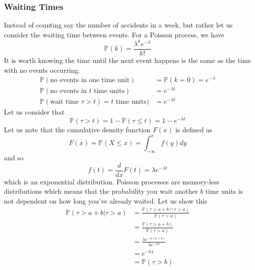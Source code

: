 \documentclass{article}
\newcommand{\od}[2]{\frac{d #1}{d #2}}
\newcommand{\p}{\mathbb{P}}
\theoremstyle{definition}
\begin{document}
\subsubsection{Waiting Times}
Instead of counting say the number of accidents in a week, but rather let us consider the waiting time between events. For a Poisson process, we have 
\begin{equation*}
    \p(k) = \frac{\lambda^ke^{-\lambda}}{k!}
\end{equation*}
It is worth knowing the time until the next event happens is the same as the time with no events occurring. 
\begin{equation*}
    \begin{split}
        \p(\text{no events in one time unit}) &=\p(k=0) = e^{-\lambda} \\
        \p(\text{no events in }t\text{ time units})&= e^{-\lambda t} \\
        \p(\text{wait time } \tau > t)=t\text{ time units})&= e^{-\lambda t}
    \end{split}
\end{equation*}
Let us consider that 
\begin{equation*}
    \p(\tau > t) =1-\p(\tau \leq t) = 1-e^{-\lambda t}
\end{equation*}
Let us note that the cumulative density function $F(x)$ is defined as
\begin{equation*}
    F(x) =\p(X\leq x)= \int^x_{-\infty}f(y) dy
\end{equation*}
and so 
\begin{equation*}
    f(t) = \od{}{x}F(t) = \lambda e^{-\lambda t}
\end{equation*}
which is an exponential distribution. Poisson processes are memory-less distributions which means that the probability you wait another $b$ time units is not dependent on how long you've already waited. Let us show this 
\begin{equation*}
    \begin{split}
        \p (\tau >a+b | \tau > a) &= \frac{\p (\tau > a+b \cap \tau >a)}{\p(\tau >a)} \\
        &= \frac{\p(\tau > a+b)}{\p(\tau>a)}\\
        &=\frac{\lambda e^{-\lambda (a+b)}}{\lambda e^{-\lambda a}} \\
        &= e^{-b\lambda}\\
        &= \p (\tau > b)
    \end{split}
\end{equation*}
\end{document}

